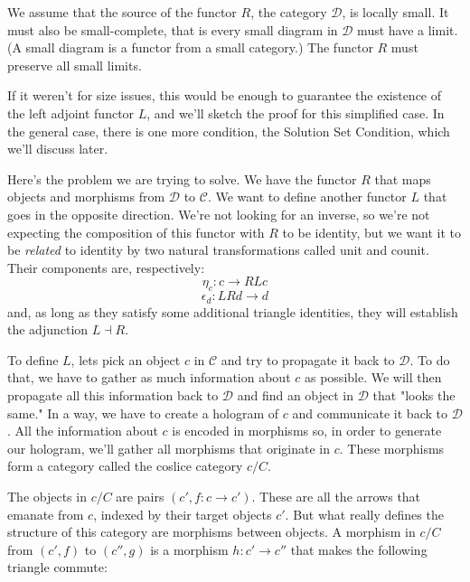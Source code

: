 \documentclass[11pt]{amsart}
\newcommand{\cat}[1]{\mathcal{#1}}
\begin{document}
We assume that the source of the functor $R$, the category $\cat D$, is locally small. It must also be small-complete, that is every small diagram in $\cat D$ must have a limit. (A small diagram is a functor from a small category.) The functor $R$ must preserve all small limits. 

If it weren't for size issues, this would be enough to guarantee the existence of the left adjoint functor $L$, and we'll sketch the proof for this simplified case. In the general case, there is one more condition, the Solution Set Condition, which we'll discuss later.

Here's the problem we are trying to solve. We have the functor $R$ that maps objects and morphisms from $\cat D$ to $\cat C$. We want to define another functor $L$ that goes in the opposite direction. We're not looking for an inverse, so we're not expecting the composition of this functor with $R$ to be identity, but we want it to be \emph{related} to identity by two natural transformations called unit and counit. Their components are, respectively:
\[ \eta_c : c \to R L c\]
\[\epsilon_d : L R d \to d \]
and, as long as they satisfy some additional triangle identities, they will establish the adjunction $L \dashv R$.

To define $L$, lets pick an object $c$ in $\cat C$ and try to propagate it back to $\cat D$. To do that, we have to gather as much information about $c$ as possible. We will then propagate all this information back to $\cat D$ and find an object in $\cat D$ that "looks the same." In a way, we have to create a hologram of $c$ and communicate it back to $\cat D$. All the information about $c$ is encoded in morphisms so, in order to generate our hologram, we'll gather all morphisms that originate in $c$. These morphisms form a category called the coslice category $c/C$. 

The objects in $c/C$ are pairs $(c', f \colon c \to c')$. These are all the arrows that emanate from $c$, indexed by their target objects $c'$. But what really defines the structure of this category are morphisms between objects. A morphism in $c/C$ from $(c', f)$ to $(c'', g)$ is a morphism $h \colon c' \to c''$ that makes the following triangle commute:

\begin{figure}[H]
\centering
\end{figure}
\end{document}
